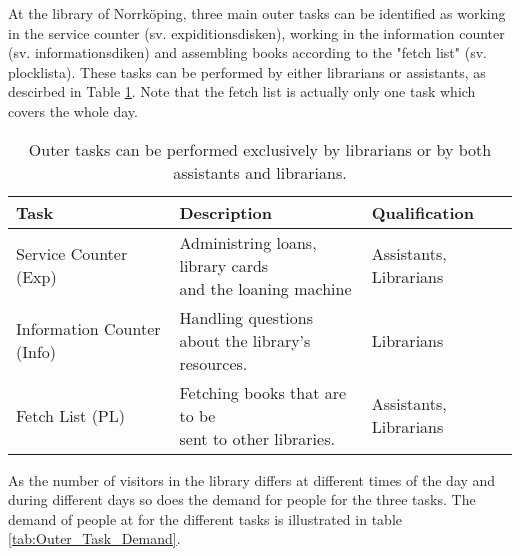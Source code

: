 At the library of Norrköping, three main outer tasks can be identified as working in the service counter (sv. expiditionsdisken), working in the information counter (sv. informationsdiken)  and assembling books according to the "fetch list" (sv. plocklista). These tasks can be performed by either librarians or assistants, as descirbed in Table \ref{tab:Outer_Tasks}. Note that the fetch list is actually only one task which covers the whole day.

\begin{table}[h]
\centering
\caption{Outer tasks can be performed exclusively by librarians or by both assistants and librarians.}
\label{tab:Outer_Tasks}
\begin{tabularx}{\textwidth}{|X|l|X|}
\hline
\textbf{Task} & \textbf{Description} & \textbf{Qualification}\\ \hline 
Service Counter (Exp)  & \specialcell[t]{Administring loans, library cards\\ and the loaning machine} & Assistants, Librarians
\\ \hline
Information Counter (Info) & \specialcell[t]{Handling questions \\about the library's resources.} & Librarians
\\ \hline 
Fetch List (PL) & \specialcell[t]{Fetching books that are to be \\sent to other libraries.} & Assistants, Librarians
\\ \hline 
\end{tabularx}
\end{table} 

As the number of visitors in the library differs at different times of the day and during different days so does the demand for people for the three tasks. The demand of people at for the different tasks is illustrated in table \ref{tab:Outer_Task_Demand}. 



